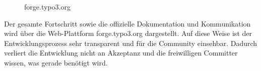 \begin{figure}[h]
	\centering
	\caption{forge.typo3.org}
	\label{forge}
\end{figure}
Der gesamte Fortschritt sowie die offizielle Dokumentation und Kommunikation wird über
die Web-Plattform forge.typo3.org dargestellt. Auf diese Weise ist der Entwicklungsprozess sehr
transparent und für die Community einsehbar. Dadurch verliert die Entwicklung nicht an Akzeptanz und
die freiwilligen Committer wissen, was gerade benötigt wird.

